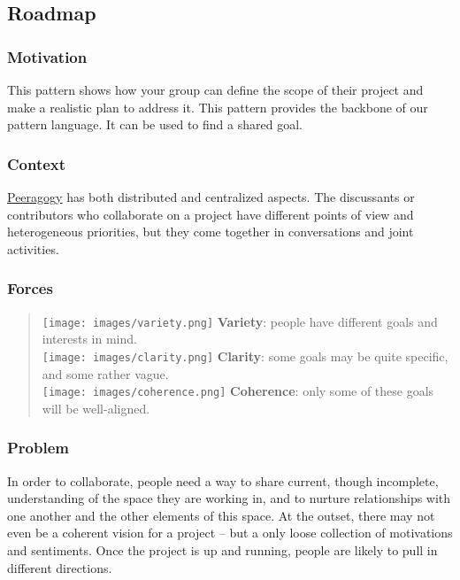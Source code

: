 \hypertarget{roadmap}{%
\subsection{Roadmap}\label{roadmap}}

\hypertarget{motivation}{%
\subsubsection{Motivation}\label{motivation}}

This pattern shows how your group can define the scope of their project
and make a realistic plan to address it. This pattern provides the
backbone of our pattern language. It can be used to find a shared goal.

\hypertarget{context}{%
\subsubsection{Context}\label{context}}

\href{http://peeragogy.github.io/pattern-peeragogy.html}{Peeragogy} has
both distributed and centralized aspects. The discussants or
contributors who collaborate on a project have different points of view
and heterogeneous priorities, but they come together in conversations
and joint activities.

\hypertarget{forces}{%
\subsubsection{Forces}\label{forces}}

\begin{quote}
\texttt{[image: images/variety.png]} \textbf{Variety}: people have
different goals and interests in mind.\\
\texttt{[image: images/clarity.png]} \textbf{Clarity}: some goals may be
quite specific, and some rather vague.\\
\texttt{[image: images/coherence.png]} \textbf{Coherence}: only some of
these goals will be well-aligned.
\end{quote}

\hypertarget{problem}{%
\subsubsection{Problem}\label{problem}}

In order to collaborate, people need a way to share current, though
incomplete, understanding of the space they are working in, and to
nurture relationships with one another and the other elements of this
space. At the outset, there may not even be a coherent vision for a
project -- but a only loose collection of motivations and sentiments.
Once the project is up and running, people are likely to pull in
different directions.

